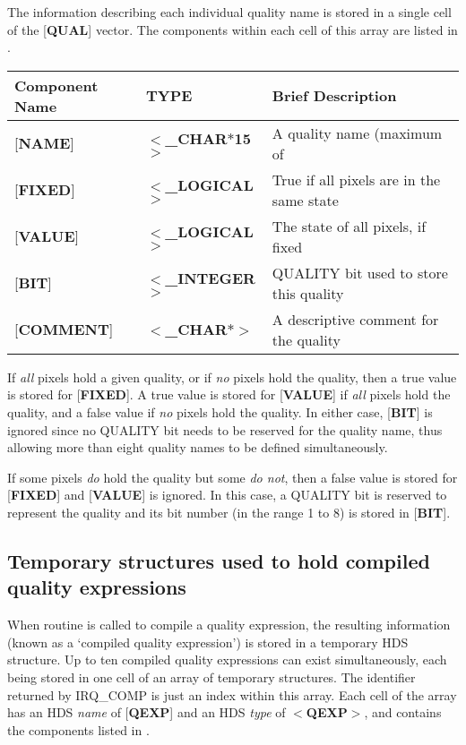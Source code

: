 \documentclass[twoside,11pt,nolof]{starlink}
\begin{document}
The information describing each individual quality name is stored in a single
cell of the {[}\textbf{QUAL}{]} vector. The components within each cell of this
array are listed in
.

\begin{table}[htb]
\centering
{}
\label{TAB:QUAL}
\begin{tabular}{|l|l|l|}
\hline
Component Name & TYPE & Brief Description \\ \hline
{[}\textbf{NAME}{]} & $<$\textbf{\_CHAR$\ast$15}$>$ & A quality name (maximum of
\\
{[}\textbf{FIXED}{]} & $<$\textbf{\_LOGICAL}$>$ & True if all pixels are in the same
state\\
{[}\textbf{VALUE}{]} & $<$\textbf{\_LOGICAL}$>$ & The state of all pixels, if fixed\\
{[}\textbf{BIT}{]} & $<$\textbf{\_INTEGER}$>$ & QUALITY bit used to store this
quality\\
{[}\textbf{COMMENT}{]} & $<$\textbf{\_CHAR$\ast$}$>$ & A descriptive comment for the
quality\\
\hline
\end{tabular}
\end{table}

If \emph{all} pixels hold a given quality, or if \emph{no} pixels hold
the quality, then a true value is stored for {[}\textbf{FIXED}{]}. A true
value is stored for {[}\textbf{VALUE}{]} if \emph{all} pixels hold the
quality, and a false value if \emph{no} pixels hold the quality. In
either case, {[}\textbf{BIT}{]} is ignored since no QUALITY bit needs to
be reserved for the quality name, thus allowing more than eight
quality names to be defined simultaneously.

If some pixels \emph{do} hold the quality but some \emph{do not}, then a
false value is stored for {[}\textbf{FIXED}{]} and {[}\textbf{VALUE}{]} is
ignored. In this case, a QUALITY bit is reserved to represent the
quality and its bit number (in the range 1 to 8) is stored in {[}\textbf{BIT}{]}.

\subsection{Temporary structures used to hold compiled quality
expressions} When routine  is called to
compile a quality expression, the resulting information (known as a
`compiled quality expression') is stored in a temporary HDS structure.
Up to ten compiled quality expressions can exist simultaneously, each
being stored in one cell of an array of temporary structures. The
identifier returned by IRQ\_COMP is just an index within this array.
Each cell of the array has an HDS \emph{name} of {[}\textbf{QEXP}{]} and
an HDS \emph{type} of $<$\textbf{QEXP}$>$, and contains the components
listed in .
\end{document}
